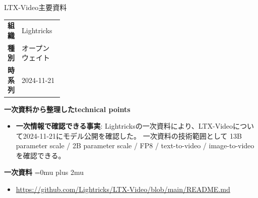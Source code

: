 \begin{technicalnote}{LTX-Video}{主要資料}
\begingroup
\begin{tabularx}{\linewidth}{@{}>{\bfseries}p{0.22\linewidth}X@{}}
組織 & Lightricks \\
種別 & オープンウェイト \\
時系列 & 2024-11-21 \\
\end{tabularx}
\smallskip
{\bfseries 一次資料から整理したtechnical points}
\begin{itemize}[leftmargin=1.5em,itemsep=0.35em]
\item \textbf{一次情報で確認できる事実}: Lightricksの一次資料により、LTX-Videoについて2024-11-21にモデル公開を確認した。 一次資料の技術範囲として 13B parameter scale / 2B parameter scale / FP8 / text-to-video / image-to-video を確認できる。
\end{itemize}
\begin{minipage}{\linewidth}
\begin{samepage}
{\bfseries 一次資料}
\begingroup\sloppy
\Urlmuskip=0mu plus 2mu\relax
\begin{itemize}[leftmargin=1.5em,itemsep=0.25em]
\item {\scriptsize\url{https://github.com/Lightricks/LTX-Video/blob/main/README.md}}
\end{itemize}
\endgroup
\end{samepage}
\end{minipage}
\endgroup
\end{technicalnote}
\medskip

